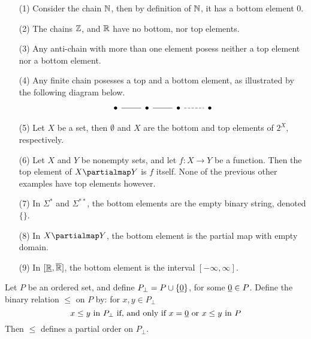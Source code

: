 \begin{example}
  \begin{enumerate}
    \item[(1)] Consider the chain $\mathbb{N}$, then by definition of $\mathbb{N}$, it
      has a bottom element $0$.

    \item[(2)] The chains $\mathbb{Z}$, and $\mathbb{R}$ have no bottom, nor top
      elements.

    \item[(3)] Any anti-chain with more than one element posess
      neither a top element nor a bottom element.

    \item[(4)] Any finite chain posesses a top and a bottom element,
      as illustrated by the following diagram below.
      \[\begin{tikzcd}
        \bullet & \bullet & \bullet & \bullet
        \arrow[no head, from=1-1, to=1-2]
        \arrow[no head, from=1-2, to=1-3]
        \arrow[dashed, no head, from=1-3, to=1-4]
      \end{tikzcd}\]

      \item[(5)] Let $X$ be a set, then  $\emptyset$ and $X$ are the
        bottom and top elements of $2^X$, respectively.

      \item[(6)] Let $X$ and $Y$ be nonempty sets, and let $f:X
        \xrightarrow{} Y$ be a function. Then the top element of $X
        \partialmap Y$ is $f$ itself. None of the previous other
        examples have top elements however.

      \item[(7)] In $\Sigma^\ast$ and $\Sigma^{\ast\ast}$, the bottom
        elements are the empty binary string, denoted $\{\}$.

      \item[(8)] In $X \partialmap Y$, the bottom element is the
        partial map with empty domain.

      \item[(9)] In $[\underline{\mathbb{R}},\overline{\mathbb{R}}]$, the bottom element is the
        interval $[-\infty, \infty]$.
  \end{enumerate}
\end{example}

\begin{proposition}\label{proposition_1.4.5}
  Let $P$ be an ordered set, and define $P_\bot=P \cup \{\underline{0}\}$,
  for some $\underline{0} \in P$. Define the binary relation $\leq$ on $P$
  by: for $x,y \in P_\bot$
  \begin{equation*}
    x \leq y \text{ in } P_\bot \text{ if, and only if }
    x=\underline{0} \text{ or } x \leq y \text{ in } P
  \end{equation*}
  Then $\leq$ defines a partial order on $P_\bot$.
\end{proposition}

